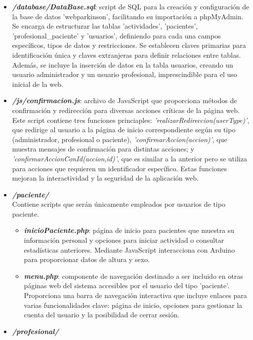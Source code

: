 \begin{itemize}
\begin{itemize}
\begin{itemize}
        \end{itemize}
        \item \textbf{\textit{/database/DataBase.sql}}: script de SQL para la creación y configuración de la base de datos 'webparkinson', facilitando su importación a phpMyAdmin. Se encarga de estructurar las tablas 'actividades', 'pacientes', 'profesional\_paciente' y 'usuarios', definiendo para cada una campos específicos, tipos de datos y restricciones. Se establecen claves primarias para identificación única y claves extranjeras para definir relaciones entre tablas. Además, se incluye la inserción de datos en la tabla usuarios, creando un usuario administrador y un usuario profesional, imprescindible para el uso inicial de la web.
        \item \textbf{\textit{/js/confirmacion.js}}: archivo de JavaScript que proporciona métodos de confirmación y redirección para diversas acciones críticas de la página web. Este script contiene tres funciones princiaples: \textit{'realizarRedireccion(userType)'}, que redirige al usuario a la página de inicio correspondiente según su tipo (administrador, profesional o paciente), \textit{'confirmarAccion(accion)'}, que muestra mensajes de confirmación para distintas acciones; y \textit{'confirmarAccionConId(accion,id)'}, que es similar a la anterior pero se utiliza para acciones que requieren un identificador específico. Estas funciones mejoran la interactividad y la seguridad de la aplicación web.
        \item \textbf{\textit{/paciente/}}\\
        Contiene scripts que serán únicamente empleados por usuarios de tipo paciente.
        \begin{itemize}
            \item \textbf{\textit{inicioPaciente.php}}: página de inicio para pacientes que muestra su información personal y opciones para iniciar actividad o consultar estadísticas anteriores. Mediante JavaScript interacciona con Arduino para proporcionar datos de altura y sexo.
            \item \textbf{\textit{menu.php}}: componente de navegación destinado a ser incluido en otras páginas web del sistema accesibles por el usuario del tipo 'paciente'. Proporciona una barra de navegación interactiva que incluye enlaces para varias funcionalidades clave: página de inicio, opciones para gestionar la cuenta del usuario y la posibilidad de cerrar sesión.
        \end{itemize}
        \item \textbf{\textit{/profesional/}}\\

\end{itemize}
\end{itemize}
